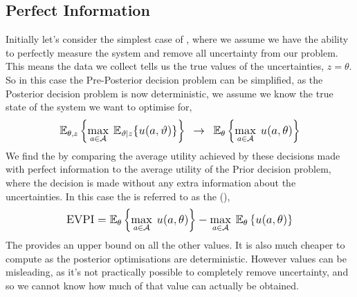 \subsection{Perfect Information}

Initially let's consider the simplest case of , where we assume we have the ability to perfectly measure the system and remove all uncertainty from our problem. This means the data we collect tells us the true values of the uncertainties, $z=\theta$. So in this case the Pre-Posterior decision problem can be simplified, as the Posterior decision problem is now deterministic, we assume we know the true state of the system we want to optimise for,
\begin{equation}
    \mathlarger{
        \mathbb{E}_{\theta,z} \left\lbrace \max_{a \in \mathcal{A}} \: \mathbb{E}_{\vartheta|z}\lbrace u(a,\vartheta) \rbrace \right\rbrace
        \:\: \rightarrow \:\:
        \mathbb{E}_{\theta} \left\lbrace \max_{a \in \mathcal{A}} \: u(a,\theta) \right\rbrace
    }
\end{equation}
We find the  by comparing the average utility achieved by these decisions made with perfect information to the average utility of the Prior decision problem, where the decision is made without any extra information about the uncertainties. In this case the  is referred to as the  (),
\begin{equation} \label{eq:evpi}
    \mathlarger{
        \text{EVPI} =
        \mathbb{E}_{\theta} \left\lbrace \max_{a \in \mathcal{A}} \: u(a,\theta) \right\rbrace
        - \max_{a \in \mathcal{A}} \: \mathbb{E}_{\theta} \left\lbrace u(a,\theta) \right\rbrace
    }
\end{equation}
The  provides an upper bound on all the other  values. It is also much cheaper to compute as the posterior optimisations are deterministic. However  values can be misleading, as it's not practically possible to completely remove uncertainty, and so we cannot know how much of that value can actually be obtained.

